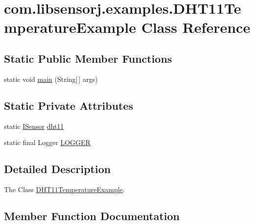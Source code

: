\hypertarget{classcom_1_1libsensorj_1_1examples_1_1DHT11TemperatureExample}{}\section{com.\+libsensorj.\+examples.\+D\+H\+T11\+Temperature\+Example Class Reference}
\label{classcom_1_1libsensorj_1_1examples_1_1DHT11TemperatureExample}
\subsection*{Static Public Member Functions}
\begin{DoxyCompactItemize}
\item 
static void \hyperlink{classcom_1_1libsensorj_1_1examples_1_1DHT11TemperatureExample_a436567d5cd7d4e55dbed6438386af490}{main} (String\mbox{[}$\,$\mbox{]} args)
\end{DoxyCompactItemize}
\subsection*{Static Private Attributes}
\begin{DoxyCompactItemize}
\item 
static \hyperlink{interfacecom_1_1libsensorj_1_1interfaces_1_1ISensor}{I\+Sensor} \hyperlink{classcom_1_1libsensorj_1_1examples_1_1DHT11TemperatureExample_ae5b24da8a75b04b9f313d9b4aaa2f058}{dht11}
\item 
static final Logger \hyperlink{classcom_1_1libsensorj_1_1examples_1_1DHT11TemperatureExample_aeff63d1b9c193a87d39c045346483fb2}{L\+O\+G\+G\+E\+R}
\end{DoxyCompactItemize}


\subsection{Detailed Description}
The Class \hyperlink{classcom_1_1libsensorj_1_1examples_1_1DHT11TemperatureExample}{D\+H\+T11\+Temperature\+Example}. 

\subsection{Member Function Documentation}
\hypertarget{classcom_1_1libsensorj_1_1examples_1_1DHT11TemperatureExample_a436567d5cd7d4e55dbed6438386af490}{}
